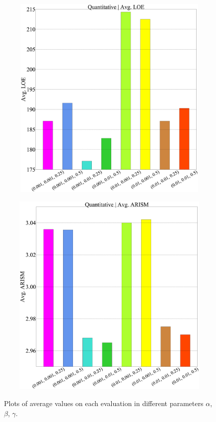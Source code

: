 \begin{figure}[tb]
	\begin{minipage}[b]{1.0\hsize}
			\centering
			\includegraphics[width=125mm, height=100mm]{images/experiment/parameter/loe.eps}
			 \label{fig:parameter/loe}
		\end{minipage}
		\begin{minipage}[b]{1.0\hsize}
				\centering
				\includegraphics[width=125mm, height=100mm]{images/experiment/parameter/arism.eps}
				 \label{fig:parameter/arism}
		\end{minipage}
		\caption{Plots of average values on each evaluation in different parameters $\alpha$, $\beta$, $\gamma$.}
		\label{fig:parameter/quantitative}
\end{figure}
